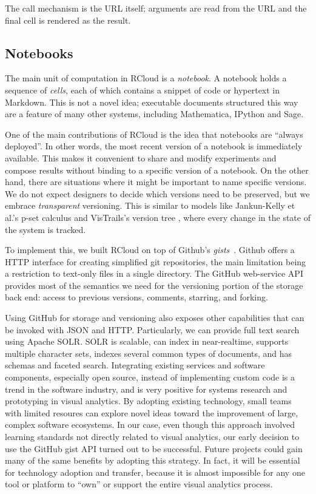 The call mechanism is the URL itself; arguments are read from the URL
and the final cell is rendered as the result. 

\subsection{Notebooks\label{sec:notebooks}}

The main unit of computation in RCloud is a \emph{notebook}.
A notebook holds a sequence of \emph{cells}, each of which contains a
snippet of code or hypertext in Markdown. This is not a novel idea;
executable documents structured this way are a feature of many
other systems, including Mathematica, IPython and Sage.

One of the main contributions of RCloud is the idea that notebooks
are ``always deployed''. In other words, the most recent version of
a notebook is immediately available.
This makes it convenient to share and modify experiments and compose
results without binding to a specific version of a notebook.
On the other hand, there are situations where it might be important
to name specific versions. We do not expect designers to decide which
versions need to be preserved, but we embrace \emph{transparent} versioning.
This is similar to models like Jankun-Kelly et al.'s p-set calculus \cite{Jankun-Kelly:2007:MFV}
and VisTrails's version tree \cite{Callahan:2006:VVM}, where every change in the state of the system is tracked.

To implement this, we built RCloud on top of Github's \emph{gists}~\cite{Github:2014:GG}.
Github offers a HTTP interface for creating simplified git repositories, the main limitation
being a restriction to text-only files in a single directory. The GitHub web-service
API provides most of the semantics we need for the versioning portion of the storage back end:
access to previous versions, comments, starring, and forking.

Using GitHub for storage and versioning also exposes other capabilities
that can be invoked with JSON and HTTP.
Particularly, we can provide full text search using Apache SOLR.
SOLR is scalable, can index in near-realtime, supports multiple character sets,
indexes several common types of documents, and has schemas and faceted search.
%
Integrating existing services and software components, especially open source,
instead of implementing custom code is a trend in the software industry, and
is very positive for systems research and prototyping in visual analytics.
By adopting existing technology, small teams with limited resoures can explore
novel ideas toward the improvement of large, complex software ecosystems.
In our case, even though this approach involved learning standards not directly
related to visual analytics, our early decision to use the GitHub gist API
turned out to be successful. Future projects could gain many of the same benefits
by adopting this strategy. In fact, it will be essential for technology adoption
and transfer, because it is almost impossible for any one tool or platform to
``own'' or support the entire visual analytics process.

